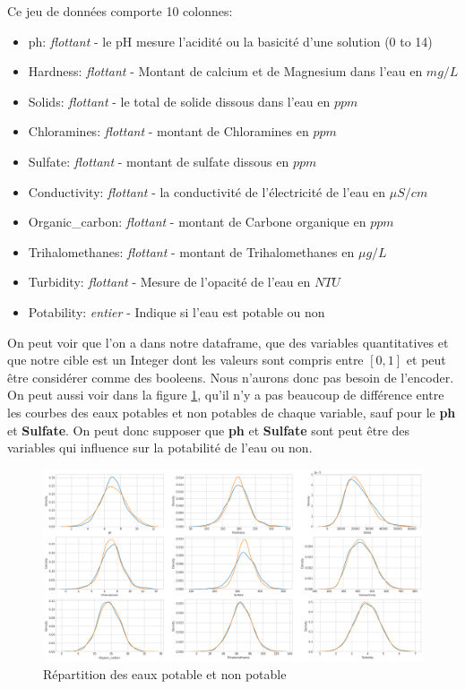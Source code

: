 \documentclass[12pt, a4paper]{article}
\begin{document}
        
    Ce jeu de données comporte 10 colonnes:
    \begin{itemize}
        \item ph: \textit{flottant} - le pH mesure l’acidité ou la basicité d’une solution (0 to 14)
        \item Hardness: \textit{flottant} - Montant de calcium et de Magnesium dans l'eau en $mg/L$	
        \item Solids: \textit{flottant}	- le total de solide dissous dans l'eau en $ppm$
        \item Chloramines: \textit{flottant}	- montant de Chloramines en $ppm$
        \item Sulfate: \textit{flottant}	- montant de sulfate dissous en $ppm$
        \item Conductivity: \textit{flottant} - la conductivité de l'électricité de l'eau en $\mu S/cm$
        \item Organic\_carbon: \textit{flottant}	- montant de Carbone organique en $ppm$
        \item Trihalomethanes: \textit{flottant}	- montant de Trihalomethanes en $\mu g/L$
        \item Turbidity: \textit{flottant} - Mesure de l'opacité de l'eau en $NTU$ 
        \item Potability: \textit{entier} - Indique si l'eau est potable ou non
    \end{itemize} On peut voir que l'on a dans notre dataframe, que des variables quantitatives et que notre cible est un Integer dont les valeurs sont compris entre $[0,1]$  et peut être considérer comme des booleens. Nous n'aurons donc pas besoin de l'encoder.\\
    On peut aussi voir dans la figure \ref{fig:courbe_overall}, qu'il n'y a pas beaucoup de différence entre les courbes des eaux potables et non potables de chaque variable, sauf pour le \textbf{ph} et \textbf{Sulfate}. On peut donc supposer que \textbf{ph} et  \textbf{Sulfate} sont peut être des variables qui influence sur la potabilité de l'eau ou non.
    
    \begin{figure}[H]
           \centering
           \includegraphics[width=\textwidth]{images/output_12_0.png}
           \caption{Répartition des eaux potable et non potable}
            \label{fig:courbe_overall}
    \end{figure}
    
\end{document}
